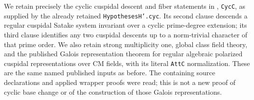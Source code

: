 We retain precisely the cyclic cuspidal descent and fiber
statements in ,
\texttt{CycC}, as supplied by the already retained
\texttt{HypothesesH'.cyc}. Its second clause descends a regular
cuspidal Satake system invariant over a cyclic prime-degree
extension; its third clause identifies any two cuspidal
descents up to a norm-trivial character of that prime order.
We also retain strong multiplicity one, global class field
theory, and the published Galois representation theorem for
regular algebraic polarized cuspidal representations over CM
fields, with its literal \texttt{AttC} normalization. These
are the same named published inputs as before. The containing
source declarations and applied wrapper proofs were read;
this is not a new proof of cyclic base change or of the
construction of those Galois representations.

